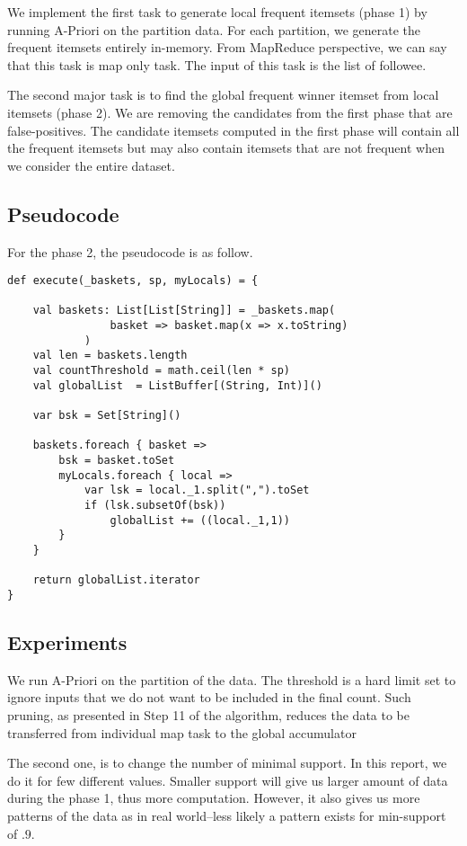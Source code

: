 \documentclass[11pt]{article}
\begin{document}
We implement the first task to generate local frequent itemsets (phase 1) by running A-Priori on the partition data.
For each partition, we generate the frequent itemsets entirely in-memory.
From MapReduce perspective, we can say that this task is map only task.
The input of this task is the list of followee.

The second major task is to find the global frequent winner itemset from local itemsets (phase 2).
We are removing the candidates from the first phase that are false-positives.
The candidate itemsets computed in the first phase will contain all the frequent itemsets but may also contain itemsets that are not frequent when we consider the entire dataset.

\subsection{Pseudocode}

For the phase 2, the pseudocode is as follow.

\begin{lstlisting}
def execute(_baskets, sp, myLocals) = {

    val baskets: List[List[String]] = _baskets.map(
                basket => basket.map(x => x.toString)
            )
    val len = baskets.length
    val countThreshold = math.ceil(len * sp)
    val globalList  = ListBuffer[(String, Int)]()

    var bsk = Set[String]()

    baskets.foreach { basket =>
        bsk = basket.toSet
        myLocals.foreach { local =>
            var lsk = local._1.split(",").toSet
            if (lsk.subsetOf(bsk))
                globalList += ((local._1,1))
        }
    }

    return globalList.iterator
}
\end{lstlisting}

\subsection{Experiments}

We run A-Priori on the partition of the data.
The threshold is a hard limit set to ignore inputs that we do not want to be included in the final count.
Such pruning, as presented in Step 11 of the algorithm, reduces the data to be transferred from individual map task to the global accumulator


The second one, is to change the number of minimal support.
In this report, we do it for few different values.
Smaller support will give us larger amount of data during the phase 1, thus more computation.
However, it also gives us more patterns of the data as in real world--less likely a pattern exists for min-support of $.9$.
\end{document}
